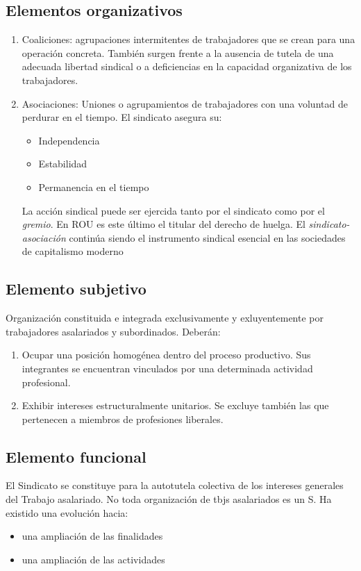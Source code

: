 \documentclass[spanish,12pt,a4paper,titlepage]{report}
\begin{document}
\subsection{Elementos organizativos}
\begin{enumerate}
\item Coaliciones: agrupaciones intermitentes de trabajadores que se crean para una operación concreta. También surgen frente a la ausencia de tutela de una adecuada libertad sindical o a deficiencias en la capacidad organizativa de los trabajadores. 

\item Asociaciones: Uniones o agrupamientos de trabajadores con una voluntad de perdurar en el tiempo. El sindicato asegura su:
	\begin{itemize}
	\item Independencia
	\item Estabilidad
	\item Permanencia en el tiempo
	\end{itemize}
La acción sindical puede ser ejercida tanto por el sindicato como por el \textit{gremio}. En ROU es este último el titular del derecho de huelga. El \textit{sindicato-asociación} continúa siendo el instrumento sindical esencial en las sociedades de capitalismo moderno
\end{enumerate}


\subsection{Elemento subjetivo}
Organización constituida e integrada exclusivamente y exluyentemente por trabajadores asalariados y subordinados. Deberán:

\begin{enumerate}
\item Ocupar una posición homogénea dentro del proceso productivo. Sus integrantes se encuentran vinculados por una determinada actividad profesional.
\item Exhibir intereses estructuralmente unitarios. Se excluye también las que pertenecen a miembros de profesiones liberales. 
\end{enumerate}

\subsection{Elemento funcional}
El Sindicato se constituye para la autotutela colectiva de los intereses generales del Trabajo asalariado. No toda organización de tbjs asalariados es un S. Ha existido una evolución hacia:
\begin{itemize}
\item una ampliación de las finalidades
\item una ampliación de las actividades
\end{itemize}
\end{document}

